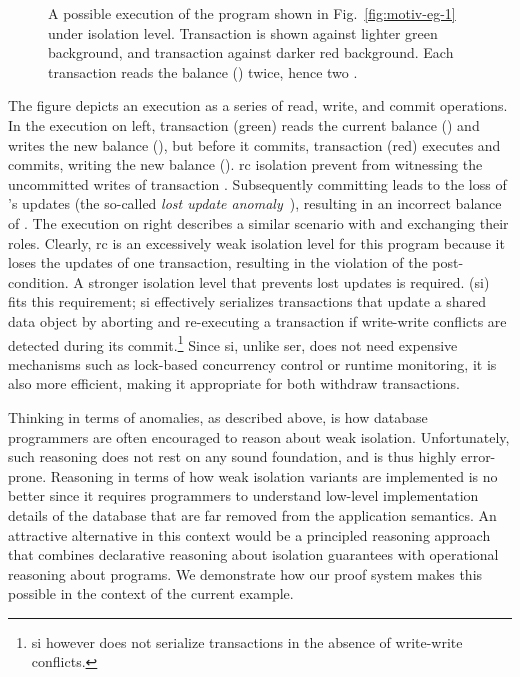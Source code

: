 \begin{figure}[!h]
{}
\caption{\small A possible execution of the program shown in Fig.~\ref{fig:motiv-eg-1} under
   isolation level. Transaction  is shown
  against lighter green background, and transaction  against
  darker red background. Each transaction reads the balance ()
  twice, hence two .}
\label{fig:rc-ex}
\end{figure}

The figure depicts an execution as a series of read, write, and commit
operations. In the execution on left, transaction  (green)
reads the current balance () and writes the new balance
(), but before it commits, transaction  (red) executes
and commits, writing the new balance (). {\sc rc} isolation
prevent  from witnessing the uncommitted writes of transaction
.  Subsequently committing  leads to the loss of
's updates (the so-called \emph{lost update
anomaly}~\cite{berenson}), resulting in an incorrect balance of
. The execution on right describes a similar scenario with
 and  exchanging their roles.  Clearly, {\sc rc} is an
excessively weak isolation level for this program because it loses the
updates of one transaction, resulting in the violation of the
post-condition.  A stronger isolation level that prevents lost updates
is required.  ({\sc si})~\cite{berenson} fits
this requirement; {\sc si} effectively serializes transactions that
update a shared data object by aborting and re-executing a transaction
if write-write conflicts are detected during its commit.\footnote{{\sc
si} however does not serialize transactions in the absence of
write-write conflicts.} Since {\sc si}, unlike {\sc ser}, does not
need expensive mechanisms such as lock-based concurrency control or
runtime monitoring, it is also more efficient, making it appropriate
for both withdraw transactions.

Thinking in terms of anomalies, as described above, is how database
programmers are often encouraged to reason about weak isolation.
Unfortunately, such reasoning does not rest on any sound foundation,
and is thus highly error-prone. Reasoning in terms of how weak
isolation variants are implemented is no better since it requires
programmers to understand low-level implementation details of the
database that are far removed from the application semantics. An
attractive  alternative in this context would be a principled
reasoning approach that combines declarative reasoning about isolation
guarantees with operational reasoning about programs. We demonstrate
how our proof system makes this possible in the context of the current
example.

